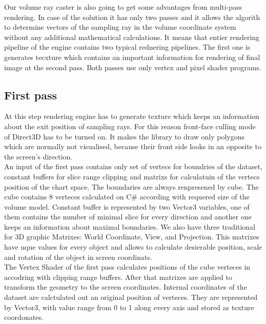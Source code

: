 \documentclass[twoside, english, 11pt]{report}
\begin{document}
Our volume ray caster is also going to get some advantages from multi-pass rendering. In case of the solution it has only two passes and it allows the algorith to determine vectors of the sampling ray in the volume coordinate system without any additional mathematical calculations. It means that entier rendering pipeline of the engine contains two typical rednering pipelines. The first one is generates tecxture which contains an important information for rendering of final image at the second pass. Both passes use only vertex and pixel shader programs.

\subsection{First pass}

At this step rendering engine has to generate texture which keeps an information about the exit position of sampling rays. For this reason front-face culling mode of Direct3D has to be turned on. It makes the library to draw only polygons which are normally not visualised, because their front side looks in an opposite to the screen's direction.\\

An input of the first pass contains only set of vertecs for boundries of the dataset, constant buffers for slice range clipping and matrixs for calculatuin of the vertecs position of the chart space. The boundaries are always renpresened by cube. The cube contains 8 verteces calculated on C\# according with requered size of the volume model. Constant buffer is represented by two Vector3 variables, one of them contains the number of minimal slice for every direction and another one keeps an information about maximal boundaries. We also have three traditional for 3D graphic Matrixes: World Coordinate, View, and Projection. This matrixes have uque values for every object and allows to calculate desierable position, scale and rotation of the object in  screen coordinats.\\

The Vertex Shader of the first pass calculates positions of the cube verteces in accodring with clipping range buffers. After that matrixes are applied to transform the geometry to the screen coordinates. Internal coordinates of the dataset are calctulated out an original position of verteces. They are represented by Vector3, with value range from 0 to 1 along every axis and stored as texture coordonates.\\
\end{document}
